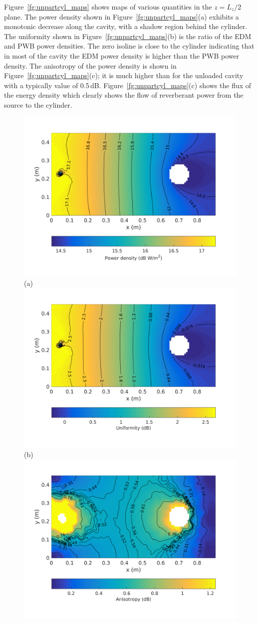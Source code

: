 \documentclass[a4paper]{article}
\numberwithin{equation}{section}
\newcounter{Figure}
\begin{document}
Figure~\ref{fg:unpartcyl_maps} shows maps of various quantities in the $z=L_z/2$ plane. The power density
shown in Figure~\ref{fg:unpartcyl_maps}(a) exhibits a monotonic decrease along the cavity, with a shadow
region behind the cylinder. The uniformity shown in Figure~\ref{fg:unpartcyl_maps}(b)
is the ratio of the EDM and PWB power densities. The zero isoline is close to the cylinder indicating that in most of 
the cavity the EDM power density is higher than the PWB power density. The anisotropy of the power density is shown in
Figure~\ref{fg:unpartcyl_maps}(c); it is much higher than for the unloaded cavity with a typically value of 0.5\,dB.
Figure~\ref{fg:unpartcyl_maps}(c) shows the flux of the energy density which clearly shows the flow of reverberant power from 
the source to the cylinder. 

\begin{figure}[ht]
\begin{center}
\includegraphics[trim={0 8mm 0 12mm},clip,width=0.52\linewidth]{figures/SDM_3D_SL_PowerDensityMap}\\
{\footnotesize (a)}\\
\vspace{2mm}
\includegraphics[trim={0 8mm 0 12mm},clip,width=0.52\linewidth]{figures/SDM_3D_SL_EnergyDensityUniformityMap}\\
{\footnotesize (b)}\\
\vspace{2mm}
\includegraphics[trim={0 8mm 0 12mm},clip,width=0.52\linewidth]{figures/SDM_3D_SL_EnergyDensityAnisotropyMap}\\

\end{center}
\end{figure}
\end{document}
